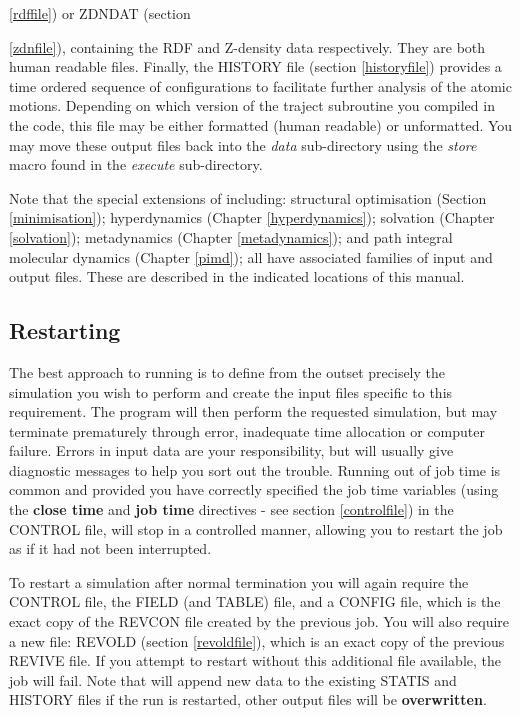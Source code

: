 {\ref{rdffile}) or ZDNDAT (section {\ref{zdnfile}), containing the
RDF and Z-density data respectively. They are both human readable
files. Finally, the HISTORY file (section \ref{historyfile})
provides a time ordered sequence of configurations to facilitate
further analysis of the atomic motions.  Depending on which
version of the {\sc traject} subroutine you compiled in the code,
this file may be either formatted (human readable) or unformatted.
You may move these output files back into the {\em data}
sub-directory using the {\sl store} macro found in the {\em
execute} sub-directory.

Note that the special extensions of \D{} including: structural 
optimisation (Section \ref{minimisation}); hyperdynamics
(Chapter \ref{hyperdynamics}); solvation (Chapter \ref{solvation});
metadynamics (Chapter \ref{metadynamics}); and path integral
molecular dynamics (Chapter \ref{pimd}); all have associated
families of input and output files. These are described in the
indicated locations of this manual.

\subsection{Restarting \D{}}

The best approach to running \D{} is to define from the outset
precisely the simulation you wish to perform and create the input
files specific to this requirement. The program will then perform the
requested simulation, but may terminate prematurely through error,
inadequate time allocation or computer failure. Errors in input data
are your responsibility, but \D{} will usually give diagnostic messages
to help you sort out the trouble. Running out of job time is common
and provided you have correctly specified the job time variables
(using the {\bf close time} and {\bf job time} directives - see
section \ref{controlfile}) in the CONTROL file, \D{} will stop in a
controlled manner, allowing you to restart the job as if it had not
been interrupted.

To restart a simulation after normal termination you will again
require the CONTROL file, the FIELD (and TABLE) file, and a CONFIG
file, which is the exact copy of the REVCON file created by the
previous job.  You will also require a new file: REVOLD (section
\ref{revoldfile}), which is an exact copy of the previous REVIVE file.
If you attempt to restart \D{} without this additional file available,
the job will fail.  Note that \D{} will append new data to the existing
STATIS and HISTORY files if the run is restarted, other output files
will be {\bf overwritten}.

}}
